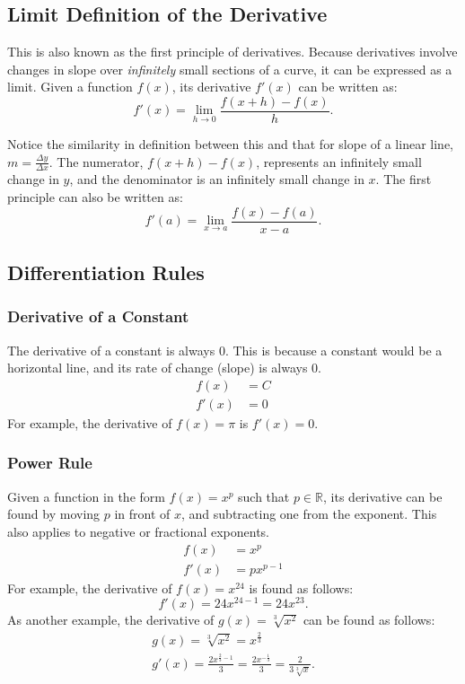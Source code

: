 \documentclass[12pt]{article}
\newcommand{\R}{\mathbb{R}} %
\begin{document}
\subsection{Limit Definition of the Derivative}
This is also known as the first principle of derivatives. Because derivatives involve changes in slope over \textit{infinitely} small sections of a curve, it can be expressed as a limit. Given a function $f(x)$, its derivative $f'(x)$ can be written as:
\[ f'(x) = \lim_{h \to 0} \frac{f(x + h) - f(x)}{h}. \]

Notice the similarity in definition between this and that for slope of a linear line, $m = \frac{\Delta y}{\Delta x}$. The numerator, $f(x + h) - f(x)$, represents an infinitely small change in $y$, and the denominator is an infinitely small change in $x$. The first principle can also be written as:
\[ f'(a) = \lim_{x \to a} \frac{f(x) - f(a)}{x - a}. \]

\subsection{Differentiation Rules}

\subsubsection{Derivative of a Constant}
The derivative of a constant is always $0$. This is because a constant would be a horizontal line, and its rate of change (slope) is always $0$.
\begin{align*}
	f(x) &= C \\
	f'(x) &= 0
\end{align*}
For example, the derivative of $f(x) = \pi$ is $f'(x) = 0$.

\subsubsection{Power Rule}
Given a function in the form $f(x) = x^p$ such that $p \in \R$, its derivative can be found by moving $p$ in front of $x$, and subtracting one from the exponent. This also applies to negative or fractional exponents.
\begin{align*}
	f(x) &= x^p \\
	f'(x) &= px^{p - 1}
\end{align*}
For example, the derivative of $f(x) = x^{24}$ is found as follows:
\[ f'(x) = 24 x^{24 - 1} = 24x^{23}. \]
As another example, the derivative of $g(x) = \sqrt[3]{x^2}$ can be found as follows:
\begin{gather*}
	g(x) = \sqrt[3]{x^2} = x^{\frac{2}{3}} \\
	g'(x) = \frac{2 x^{\frac{2}{3} - 1}}{3} = \frac{2 x^{-\frac{1}{3}}}{3} = \frac{2}{3 \sqrt[3]{x}}.
\end{gather*}
\end{document}
